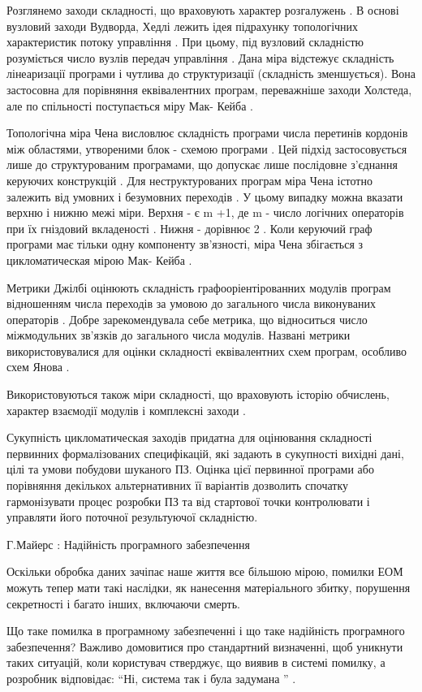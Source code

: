 Розглянемо заходи складності, що враховують характер розгалужень . В основі вузловий заходи Вудворда, Хедлі лежить ідея підрахунку топологічних характеристик потоку управління . При цьому, під вузловий складністю розуміється число вузлів передач управління . Дана міра відстежує складність лінеаризації програми і чутлива до структуризації (складність зменшується). Вона застосовна для порівняння еквівалентних програм, переважніше заходи Холстеда, але по спільності поступається міру Мак- Кейба .

Топологічна міра Чена висловлює складність програми числа перетинів кордонів між областями, утвореними блок - схемою програми . Цей підхід застосовується лише до структурованим програмами, що допускає лише послідовне з'єднання керуючих конструкцій . Для неструктурованих програм міра Чена істотно залежить від умовних і безумовних переходів . У цьому випадку можна вказати верхню і нижню межі міри. Верхня - є m +1, де m - число логічних операторів при їх гніздовий вкладеності . Нижня - дорівнює 2 . Коли керуючий граф програми має тільки одну компоненту зв'язності, міра Чена збігається з цикломатическая мірою Мак- Кейба .

Метрики Джілбі оцінюють складність графооріентірованних модулів програм відношенням числа переходів за умовою до загального числа виконуваних операторів . Добре зарекомендувала себе метрика, що відноситься число міжмодульних зв'язків до загального числа модулів. Названі метрики використовувалися для оцінки складності еквівалентних схем програм, особливо схем Янова .

Використовуються також міри складності, що враховують історію обчислень, характер взаємодії модулів і комплексні заходи .

Сукупність цикломатическая заходів придатна для оцінювання складності первинних формалізованих специфікацій, які задають в сукупності вихідні дані, цілі та умови побудови шуканого ПЗ. Оцінка цієї первинної програми або порівняння декількох альтернативних її варіантів дозволить спочатку гармонізувати процес розробки ПЗ та від стартової точки контролювати і управляти його поточної результуючої складністю.

Г.Майерс : Надійність програмного забезпечення

Оскільки обробка даних зачіпає наше життя все більшою мірою, помилки ЕОМ можуть тепер мати такі наслідки, як нанесення матеріального збитку, порушення секретності і багато інших, включаючи смерть.

Що таке помилка в програмному забезпеченні і що таке надійність програмного забезпечення? Важливо домовитися про стандартний визначенні, щоб уникнути таких ситуацій, коли користувач стверджує, що виявив в системі помилку, а розробник відповідає: ``Ні, система так і була задумана '' .

